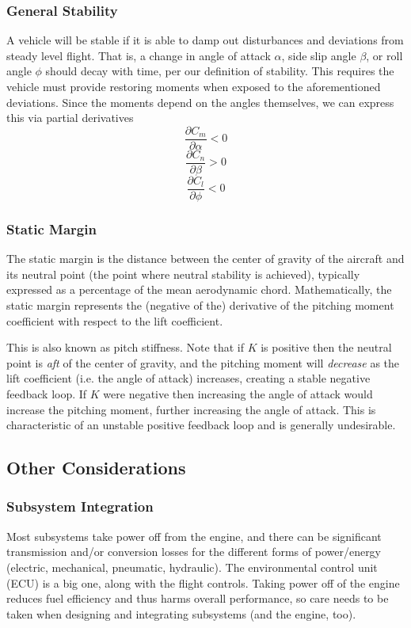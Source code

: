 \documentclass[11pt]{article}
\newcommand{\CenteredBoxed}[1]{\begin{center}\boxed{#1}\end{center}}
\newcommand{\Partial}[2]{\frac{\partial #1}{\partial #2}}
\begin{document}
\subsubsection{General Stability}
A vehicle will be stable if it is able to damp out disturbances and deviations from steady level flight. That is, a change in angle of attack $\alpha$, side slip angle $\beta$, or roll angle $\phi$ should decay with time, per our definition of stability. This requires the vehicle must provide restoring moments when exposed to the aforementioned deviations. Since the moments depend on the angles themselves, we can express this via partial derivatives
$$\Partial{C_m}{\alpha}<0$$
$$\Partial{C_n}{\beta}>0$$
$$\Partial{C_l}{\phi}<0$$

\subsubsection{Static Margin}
The static margin is the distance between the center of gravity of the aircraft and its neutral point (the point where neutral stability is achieved), typically expressed as a percentage of the mean aerodynamic chord. Mathematically, the static margin represents the (negative of the) derivative of the pitching moment coefficient with respect to the lift coefficient. 
\CenteredBoxed{\Partial{C_M}{C_L}=-\left(\frac{x_{NP}-x_{cg}}{MAC}\right) = -K}

This is also known as pitch stiffness. Note that if $K$ is positive then the neutral point is \emph{aft} of the center of gravity, and the pitching moment will \emph{decrease} as the lift coefficient (i.e. the angle of attack) increases, creating a stable negative feedback loop. If $K$ were negative then increasing the angle of attack would increase the pitching moment, further increasing the angle of attack. This is characteristic of an unstable positive feedback loop and is generally undesirable.

\subsection{Other Considerations}
\subsubsection{Subsystem Integration}
Most subsystems take power off from the engine, and there can be significant transmission and/or conversion losses for the different forms of power/energy (electric, mechanical, pneumatic, hydraulic). The environmental control unit (ECU) is a big one, along with the flight controls. Taking power off of the engine reduces fuel efficiency and thus harms overall performance, so care needs to be taken when designing and integrating subsystems (and the engine, too).
\end{document}
